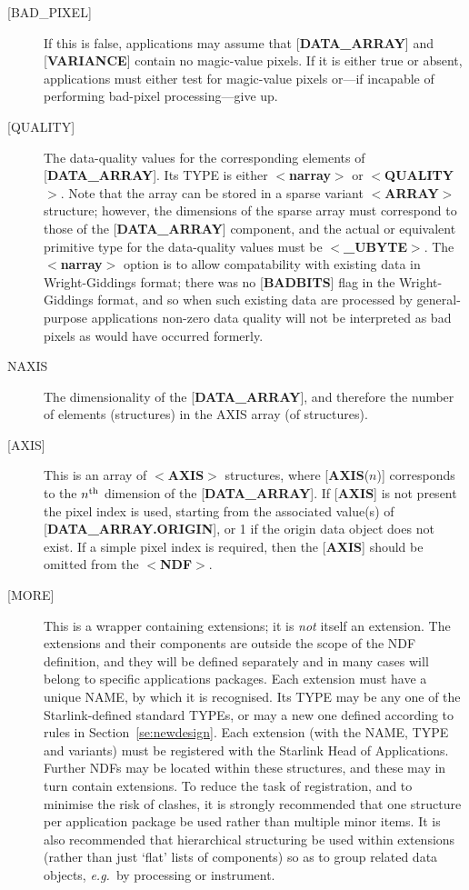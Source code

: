 \documentclass[twoside,11pt]{article}
\newcommand{\htmlref}[2]{#1}
\newcommand{\html}[1]{}
\newcommand{\latex}[1]{#1}
\begin{document}
\begin{description}
\item [{[}BAD\_PIXEL{]}]  If this
is false, applications may assume that
{[}{\bf DATA\_ARRAY}{]} and {[}{\bf VARIANCE}{]} contain no magic-value
pixels. If it is either true or absent, applications
must either test for magic-value pixels or---if incapable
of performing bad-pixel processing---give up.
\item [{[}QUALITY{]}]  The data-quality values for the
corresponding elements of {[}{\bf DATA\_ARRAY}{]}.
Its TYPE is either $<${\bf narray}$>$ or $<${\bf QUALITY}$>$.
Note that the array can be stored
in a sparse variant \mbox{$<${\bf ARRAY}$>$} structure;
however, the dimensions of the sparse array must correspond to those of the
{[}{\bf DATA\_ARRAY}{]} component, and the actual or equivalent
primitive type for the data-quality values must be $<${\bf \_UBYTE}$>$.
The $<${\bf narray}$>$ option is to allow compatability with existing data in
Wright-Giddings format; there was no
{[}{\bf BADBITS}{]} flag in the Wright-Giddings format,
and so when such existing data are processed by
general-purpose applications
non-zero data quality will not be interpreted as
bad pixels as would have occurred formerly.
\item [NAXIS]  The dimensionality of
the {[}{\bf DATA\_ARRAY}{]}, and therefore
the number of elements (structures) in the AXIS array
(of structures).
\item [{[}AXIS{]}] This is an array of $<${\bf AXIS}$>$ structures, where
{[}{\bf AXIS}($n$){]} corresponds to the $n^{\rm th}$ dimension of the
{[}{\bf DATA\_ARRAY}{]}.
If {[}{\bf AXIS}{]} is not present the pixel index is used, starting
from the associated value(s) of {[}{\bf DATA\_ARRAY.ORIGIN}{]}, or 1 if the
origin data object does not exist. If a simple pixel index is required,
then the {[}{\bf AXIS}{]} should be omitted from the $<${\bf NDF}$>$.
\item [{[}MORE{]}]  This is a wrapper containing extensions; it is {\em 
not} itself an extension. The extensions and their components
are outside the scope of the NDF definition, and they will
be defined separately and in many cases will belong
to specific applications packages.
Each extension must have a unique NAME, by which it is recognised.
Its TYPE may be any one of the Starlink-defined standard TYPEs, or
may a new one defined according to rules in 
\latex{Section~\ref{se:newdesign}.}\html{\htmlref{Creating New
Structures.}{se:newdesign}}
Each extension (with the NAME, TYPE and variants)
must be registered with the Starlink Head of Applications.
Further NDFs may be located within these structures, and these
may in turn contain extensions.  To reduce the task of registration,
and to minimise the risk of clashes, it is strongly recommended
that one structure per application package be used rather than multiple
minor items. It is also recommended that hierarchical structuring be used
within extensions (rather than just `flat' lists of components)
so as to group related data objects, {\it e.g.}\  by
processing or instrument.  
\end{description}
\end{document}
